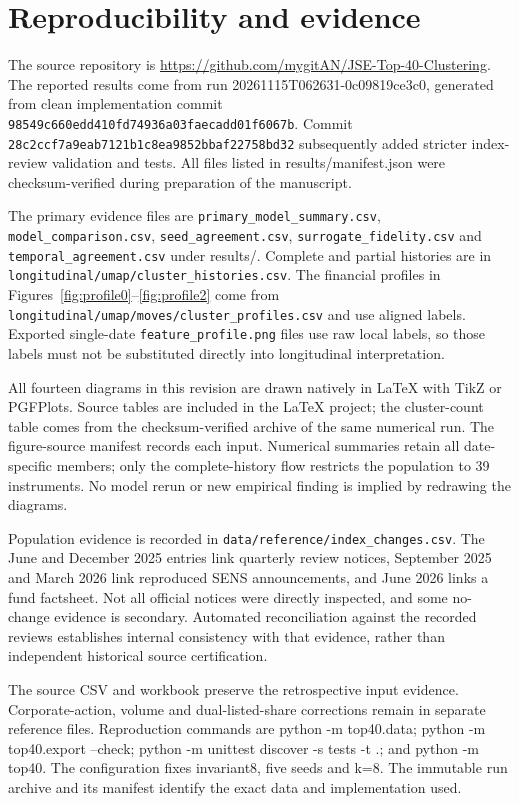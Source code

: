 \section{Reproducibility and evidence}

The source repository is \url{https://github.com/mygitAN/JSE-Top-40-Clustering}. The reported results come from run 20261115T062631-0c09819ce3c0, generated from clean implementation commit \nolinkurl{98549c660edd410fd74936a03faecadd01f6067b}. Commit \nolinkurl{28c2ccf7a9eab7121b1c8ea9852bbaf22758bd32} subsequently added stricter index-review validation and tests. All files listed in results/manifest.json were checksum-verified during preparation of the manuscript.


The primary evidence files are \nolinkurl{primary_model_summary.csv}, \nolinkurl{model_comparison.csv}, \nolinkurl{seed_agreement.csv}, \nolinkurl{surrogate_fidelity.csv} and \nolinkurl{temporal_agreement.csv} under results/. Complete and partial histories are in \nolinkurl{longitudinal/umap/cluster_histories.csv}. The financial profiles in Figures~\ref{fig:profile0}--\ref{fig:profile2} come from \nolinkurl{longitudinal/umap/moves/cluster_profiles.csv} and use aligned labels. Exported single-date \nolinkurl{feature_profile.png} files use raw local labels, so those labels must not be substituted directly into longitudinal interpretation.


All fourteen diagrams in this revision are drawn natively in LaTeX with TikZ or PGFPlots. Source tables are included in the LaTeX project; the cluster-count table comes from the checksum-verified archive of the same numerical run. The figure-source manifest records each input. Numerical summaries retain all date-specific members; only the complete-history flow restricts the population to 39 instruments. No model rerun or new empirical finding is implied by redrawing the diagrams.


Population evidence is recorded in \nolinkurl{data/reference/index_changes.csv}. The June and December 2025 entries link quarterly review notices, September 2025 and March 2026 link reproduced SENS announcements, and June 2026 links a fund factsheet. Not all official notices were directly inspected, and some no-change evidence is secondary. Automated reconciliation against the recorded reviews establishes internal consistency with that evidence, rather than independent historical source certification.


The source CSV and workbook preserve the retrospective input evidence. Corporate-action, volume and dual-listed-share corrections remain in separate reference files. Reproduction commands are python -m top40.data; python -m top40.export --check; python -m unittest discover -s tests -t .; and python -m top40. The configuration fixes invariant8, five seeds and k=8. The immutable run archive and its manifest identify the exact data and implementation used.
